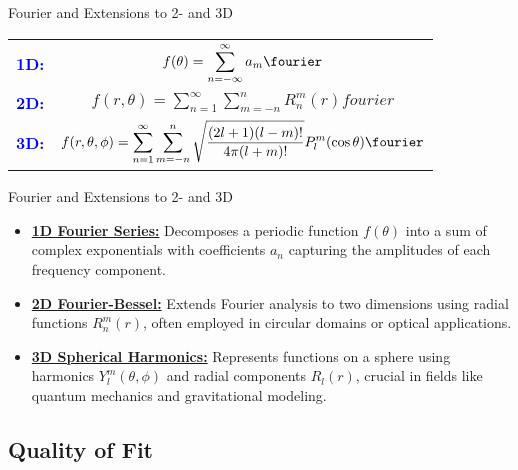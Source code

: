 \begin{frame}{Fourier and Extensions to 2- and 3D}
    \centering
    \renewcommand{\arraystretch}{2.0}
    \setlength{\tabcolsep}{10pt} %
    
    \begin{tabular}{@{} l c @{}} %
        \textcolor{blue}{\textbf{1D:}} & 
        \( \displaystyle f(\theta) = \sum_{n=-\infty}^{\infty} a_m \fourier \) \\[1em]

        \textcolor{blue}{\textbf{2D:}} & 
        \( \displaystyle f(r, \theta) = \sum_{n=1}^{\infty}\sum_{m=-n}^{n} R_n^m(r) fourier  \) \\[1em]

        \textcolor{blue}{\textbf{3D:}} & 
        \( \displaystyle 
        f(r, \theta, \phi) = 
        \sum_{n=1}^{\infty}\sum_{m=-n}^{n} 
        \sqrt{\frac{(2l+1)(l-m)!}{4\pi (l+m)!}} 
        P_l^m(\cos \theta) \fourier 
        \)
    \end{tabular}
\end{frame}
	
\begin{frame}{Fourier and Extensions to 2- and 3D}
    \begin{itemize}
        \item \href{https://mathworld.wolfram.com/FourierSeries.html}{\textbf{1D Fourier Series:}} Decomposes a periodic function \(f(\theta)\) into a sum of complex exponentials with coefficients \(a_n\) capturing the amplitudes of each frequency component.
        \item \href{https://mathworld.wolfram.com/ZernikePolynomial.html}{\textbf{2D Fourier-Bessel:}} Extends Fourier analysis to two dimensions using radial functions \(R_n^m(r)\), often employed in circular domains or optical applications.
        \item \href{https://mathworld.wolfram.com/SphericalHarmonic.html}{\textbf{3D Spherical Harmonics:}} Represents functions on a sphere using harmonics \(Y_l^m(\theta, \phi)\) and radial components \(R_l(r)\), crucial in fields like quantum mechanics and gravitational modeling.
    \end{itemize}
\end{frame}


\subsection{Quality of Fit}

\endinput  %
